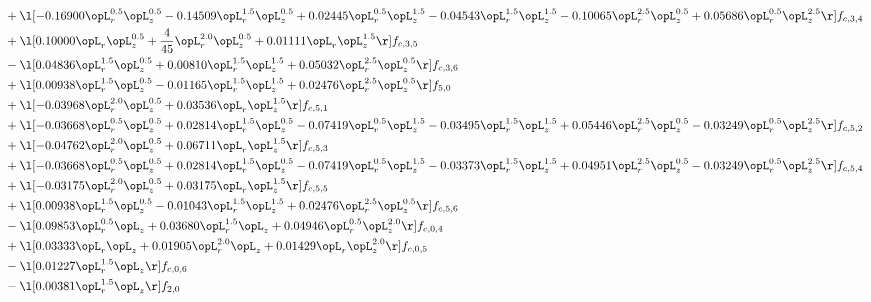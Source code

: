 \begin{alignat}{2}
& + \l[  -0.16900 \opL_r^{0.5} \opL_z^{0.5}   -0.14509 \opL_r^{1.5} \opL_z^{0.5} +  0.02445 \opL_r^{0.5} \opL_z^{1.5}   -0.04543 \opL_r^{1.5} \opL_z^{1.5}   -0.10065 \opL_r^{2.5} \opL_z^{0.5} +  0.05686 \opL_r^{0.5} \opL_z^{2.5}  \r] f_{c,3,4} \nonumber \\ 
& + \l[  0.10000 \opL_r \opL_z^{0.5} + \frac{4}{45} \opL_r^{2.0} \opL_z^{0.5} +  0.01111 \opL_r \opL_z^{1.5}  \r] f_{c,3,5} \nonumber \\ 
& - \l[  0.04836 \opL_r^{1.5} \opL_z^{0.5} +  0.00810 \opL_r^{1.5} \opL_z^{1.5} +  0.05032 \opL_r^{2.5} \opL_z^{0.5}  \r] f_{c,3,6} \nonumber \\ 
& + \l[  0.00938 \opL_r^{1.5} \opL_z^{0.5}   -0.01165 \opL_r^{1.5} \opL_z^{1.5} +  0.02476 \opL_r^{2.5} \opL_z^{0.5}  \r] f_{5,0} \nonumber \\ 
& + \l[  -0.03968 \opL_r^{2.0} \opL_z^{0.5} +  0.03536 \opL_r \opL_z^{1.5}  \r] f_{c,5,1} \nonumber \\ 
& + \l[  -0.03668 \opL_r^{0.5} \opL_z^{0.5} +  0.02814 \opL_r^{1.5} \opL_z^{0.5}   -0.07419 \opL_r^{0.5} \opL_z^{1.5}   -0.03495 \opL_r^{1.5} \opL_z^{1.5} +  0.05446 \opL_r^{2.5} \opL_z^{0.5}   -0.03249 \opL_r^{0.5} \opL_z^{2.5}  \r] f_{c,5,2} \nonumber \\ 
& + \l[  -0.04762 \opL_r^{2.0} \opL_z^{0.5} +  0.06711 \opL_r \opL_z^{1.5}  \r] f_{c,5,3} \nonumber \\ 
& + \l[  -0.03668 \opL_r^{0.5} \opL_z^{0.5} +  0.02814 \opL_r^{1.5} \opL_z^{0.5}   -0.07419 \opL_r^{0.5} \opL_z^{1.5}   -0.03373 \opL_r^{1.5} \opL_z^{1.5} +  0.04951 \opL_r^{2.5} \opL_z^{0.5}   -0.03249 \opL_r^{0.5} \opL_z^{2.5}  \r] f_{c,5,4} \nonumber \\ 
& + \l[  -0.03175 \opL_r^{2.0} \opL_z^{0.5} +  0.03175 \opL_r \opL_z^{1.5}  \r] f_{c,5,5} \nonumber \\ 
& + \l[  0.00938 \opL_r^{1.5} \opL_z^{0.5}   -0.01043 \opL_r^{1.5} \opL_z^{1.5} +  0.02476 \opL_r^{2.5} \opL_z^{0.5}  \r] f_{c,5,6} \nonumber \\ 
& - \l[  0.09853 \opL_r^{0.5} \opL_z +  0.03680 \opL_r^{1.5} \opL_z +  0.04946 \opL_r^{0.5} \opL_z^{2.0}  \r] f_{c,0,4} \nonumber \\ 
& + \l[  0.03333 \opL_r \opL_z +  0.01905 \opL_r^{2.0} \opL_z +  0.01429 \opL_r \opL_z^{2.0}  \r] f_{c,0,5} \nonumber \\ 
& - \l[  0.01227 \opL_r^{1.5} \opL_z  \r] f_{c,0,6} \nonumber \\ 
& - \l[  0.00381 \opL_r^{1.5} \opL_z  \r] f_{2,0} \nonumber \\ 

\end{alignat}
